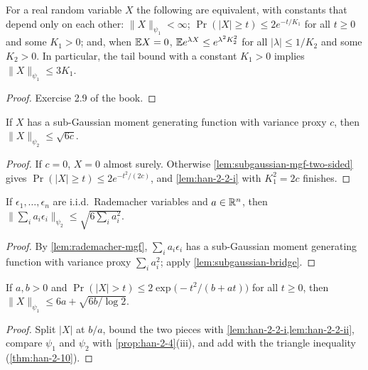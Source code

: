 \begin{lemma}
  \label{lem:han-2-2-ii}
  For a real random variable $X$ the following are equivalent, with constants that depend only on each other: $\|X\|_{\psi_1}<\infty$; $\Pr(|X|\ge t)\le2e^{-t/K_1}$ for all $t\ge0$ and some $K_1>0$; and, when $\mathbb{E} X=0$, $\mathbb{E} e^{\lambda X}\le e^{\lambda^2K_2^2}$ for all $|\lambda|\le1/K_2$ and some $K_2>0$. In particular, the tail bound with a constant $K_1>0$ implies $\|X\|_{\psi_1}\le3K_1$.
\end{lemma}
\begin{proof}
  Exercise 2.9 of the book.
\end{proof}

\begin{lemma}
  \label{lem:subgaussian-bridge}
  If $X$ has a sub-Gaussian moment generating function with variance proxy $c$, then $\|X\|_{\psi_2}\le\sqrt{6c}$.
\end{lemma}
\begin{proof}
  If $c=0$, $X=0$ almost surely. Otherwise \cref{lem:subgaussian-mgf-two-sided} gives $\Pr(|X|\ge t)\le2e^{-t^2/(2c)}$, and \cref{lem:han-2-2-i} with $K_1^2=2c$ finishes.
\end{proof}

\begin{lemma}
  \label{lem:rademacher-psi2}
  If $\epsilon_1,\dots,\epsilon_n$ are i.i.d.\ Rademacher variables and $a\in\mathbb{R}^n$, then $\bigl\|\sum_ia_i\epsilon_i\bigr\|_{\psi_2}\le\sqrt{6\sum_ia_i^2}$.
\end{lemma}
\begin{proof}
  By \cref{lem:rademacher-mgf}, $\sum_ia_i\epsilon_i$ has a sub-Gaussian moment generating function with variance proxy $\sum_ia_i^2$; apply \cref{lem:subgaussian-bridge}.
\end{proof}

\begin{lemma}
  \label{lem:han-2-4}
  If $a,b>0$ and $\Pr(|X|>t)\le2\exp\bigl(-t^2/(b+at)\bigr)$ for all $t\ge0$, then $\|X\|_{\psi_1}\le6a+\sqrt{6b/\log2}$.
\end{lemma}
\begin{proof}
  Split $|X|$ at $b/a$, bound the two pieces with \cref{lem:han-2-2-i,lem:han-2-2-ii}, compare $\psi_1$ and $\psi_2$ with \cref{prop:han-2-4}(iii), and add with the triangle inequality (\cref{thm:han-2-10}).
\end{proof}

